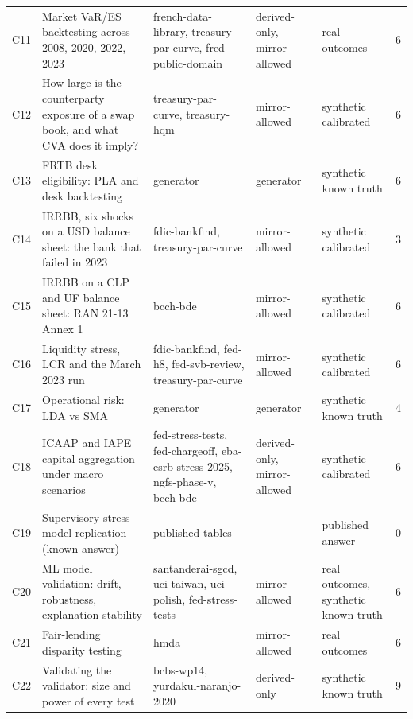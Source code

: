 {\begin{longtable}{l>{\raggedright\arraybackslash}p{4.0cm}>{\raggedright\arraybackslash}p{2.9cm}>{\raggedright\arraybackslash}p{2.2cm}>{\raggedright\arraybackslash}p{3.0cm}r}
C11 & Market VaR/ES backtesting across 2008, 2020, 2022, 2023 & french-data-library, treasury-par-curve, fred-public-domain & derived-only, mirror-allowed & real outcomes & 6 \\
C12 & How large is the counterparty exposure of a swap book, and what CVA does it imply? & treasury-par-curve, treasury-hqm & mirror-allowed & synthetic calibrated & 6 \\
C13 & FRTB desk eligibility: PLA and desk backtesting & generator & generator & synthetic known truth & 6 \\
C14 & IRRBB, six shocks on a USD balance sheet: the bank that failed in 2023 & fdic-bankfind, treasury-par-curve & mirror-allowed & synthetic calibrated & 3 \\
C15 & IRRBB on a CLP and UF balance sheet: RAN 21-13 Annex 1 & bcch-bde & mirror-allowed & synthetic calibrated & 6 \\
C16 & Liquidity stress, LCR and the March 2023 run & fdic-bankfind, fed-h8, fed-svb-review, treasury-par-curve & mirror-allowed & synthetic calibrated & 6 \\
C17 & Operational risk: LDA vs SMA & generator & generator & synthetic known truth & 4 \\
C18 & ICAAP and IAPE capital aggregation under macro scenarios & fed-stress-tests, fed-chargeoff, eba-esrb-stress-2025, ngfs-phase-v, bcch-bde & derived-only, mirror-allowed & synthetic calibrated & 6 \\
C19 & Supervisory stress model replication (known answer) & published tables & -- & published answer & 0 \\
C20 & ML model validation: drift, robustness, explanation stability & santanderai-sgcd, uci-taiwan, uci-polish, fed-stress-tests & mirror-allowed & real outcomes, synthetic known truth & 6 \\
C21 & Fair-lending disparity testing & hmda & mirror-allowed & real outcomes & 6 \\
C22 & Validating the validator: size and power of every test & bcbs-wp14, yurdakul-naranjo-2020 & derived-only & synthetic known truth & 9 \\
\end{longtable}
}

